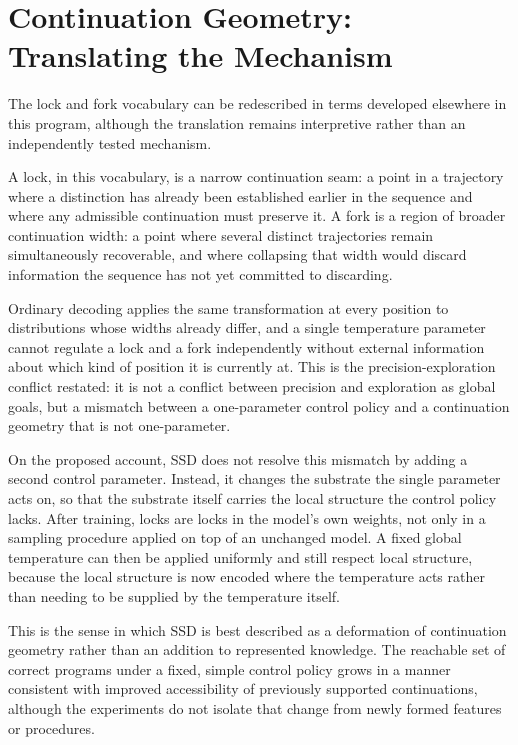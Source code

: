\documentclass[11pt]{article}
\begin{document}
\section{Continuation Geometry: Translating the Mechanism}

The lock and fork vocabulary can be redescribed in terms developed elsewhere in this program, although the translation remains interpretive rather than an independently tested mechanism.

A lock, in this vocabulary, is a narrow continuation seam: a point in a trajectory where a distinction has already been established earlier in the sequence and where any admissible continuation must preserve it. A fork is a region of broader continuation width: a point where several distinct trajectories remain simultaneously recoverable, and where collapsing that width would discard information the sequence has not yet committed to discarding.

Ordinary decoding applies the same transformation at every position to distributions whose widths already differ, and a single temperature parameter cannot regulate a lock and a fork independently without external information about which kind of position it is currently at. This is the precision-exploration conflict restated: it is not a conflict between precision and exploration as global goals, but a mismatch between a one-parameter control policy and a continuation geometry that is not one-parameter.

On the proposed account, SSD does not resolve this mismatch by adding a second control parameter. Instead, it changes the substrate the single parameter acts on, so that the substrate itself carries the local structure the control policy lacks. After training, locks are locks in the model's own weights, not only in a sampling procedure applied on top of an unchanged model. A fixed global temperature can then be applied uniformly and still respect local structure, because the local structure is now encoded where the temperature acts rather than needing to be supplied by the temperature itself.

This is the sense in which SSD is best described as a deformation of continuation geometry rather than an addition to represented knowledge. The reachable set of correct programs under a fixed, simple control policy grows in a manner consistent with improved accessibility of previously supported continuations, although the experiments do not isolate that change from newly formed features or procedures.
\end{document}
